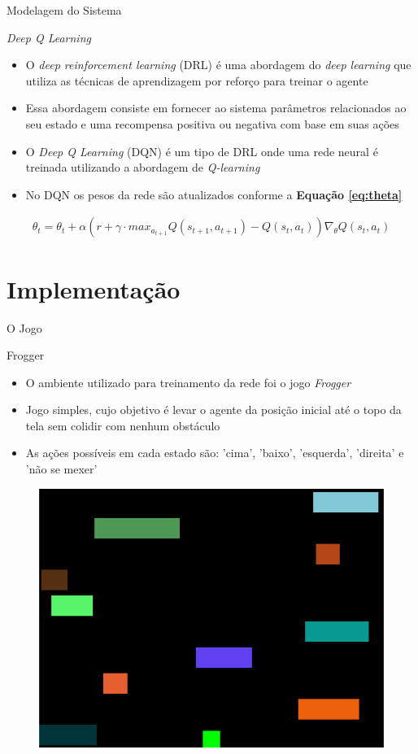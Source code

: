 \documentclass[aspectratio=169]{beamer}
\begin{document}
\begin{frame}{Modelagem do Sistema}
	\begin{block}{\textit{Deep Q Learning}}
		\begin{itemize}
			\item 
			O \textit{deep reinforcement learning} (DRL) é uma abordagem do \textit{deep learning} que utiliza as técnicas de aprendizagem por reforço para treinar o agente

			\item Essa abordagem consiste em fornecer ao sistema parâmetros relacionados ao seu estado e uma recompensa positiva ou negativa com base em suas ações

			\item O \textit{Deep Q Learning} (DQN) é um tipo de DRL onde uma rede neural é treinada utilizando a abordagem de \textit{Q-learning}

			\item No DQN os pesos da rede são atualizados conforme a \textbf{Equação \ref{eq:theta}}
		\end{itemize}
	\end{block}

	\begin{eqnarray}
	  \theta_t = \theta_t + \alpha(r + \gamma\cdot max_{a_{t+1}}Q(s_{t+1},a_{t+1}) - Q(s_t,a_t))\nabla_\theta Q(s_t,a_t)
	  \label{eq:theta}
	\end{eqnarray}

\end{frame}


\section{Implementação}

\begin{frame}{O Jogo}
\begin{block}{Frogger}
	\begin{itemize}
		\item O ambiente utilizado para treinamento da rede foi o jogo \textit{Frogger}
		\item Jogo simples, cujo objetivo é levar o agente da posição inicial até o topo da tela sem colidir com nenhum obstáculo
		\item As ações possíveis em cada estado são: 'cima', 'baixo', 'esquerda', 'direita' e 'não se mexer'
	\end{itemize}
\end{block}
\begin{figure}[h]
  \centering
  \includegraphics[width=.3 \textwidth]{imgs/frogg_ini_state.png}
 \end{figure}
\end{frame}
\end{document}
